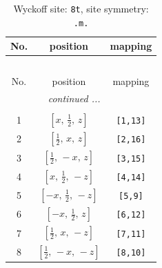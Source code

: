 \documentclass[fleqn,8pt]{jsarticle}
\begin{document}
\renewcommand{\arraystretch}{1.2}
\begin{longtable}{ccc}
\caption{Wyckoff site: {\tt 8t}, site symmetry: {\tt .m.}}
 \\
 \hline \hline
No. & position & mapping \\ \hline \endfirsthead

\multicolumn{2}{l}{\tablename\ \thetable{}} \\
 \hline \hline
No. & position & mapping \\ \hline \endhead

 \hline \hline
\multicolumn{2}{r}{\footnotesize\it continued ...} \\ \endfoot

 \hline \hline
\multicolumn{2}{r}{} \\ \endlastfoot

1 & $\left[ x,\, \frac{1}{2},\, z \right]$ & {\tt [1,13]} \\ \hline
2 & $\left[ \frac{1}{2},\, x,\, z \right]$ & {\tt [2,16]} \\ \hline
3 & $\left[ \frac{1}{2},\, - x,\, z \right]$ & {\tt [3,15]} \\ \hline
4 & $\left[ x,\, \frac{1}{2},\, - z \right]$ & {\tt [4,14]} \\ \hline
5 & $\left[ - x,\, \frac{1}{2},\, - z \right]$ & {\tt [5,9]} \\ \hline
6 & $\left[ - x,\, \frac{1}{2},\, z \right]$ & {\tt [6,12]} \\ \hline
7 & $\left[ \frac{1}{2},\, x,\, - z \right]$ & {\tt [7,11]} \\ \hline
8 & $\left[ \frac{1}{2},\, - x,\, - z \right]$ & {\tt [8,10]} \\
\end{longtable}
\renewcommand{\arraystretch}{1.2}
\end{document}
